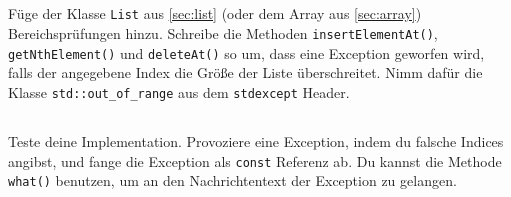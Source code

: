 \subsection{}
Füge der Klasse \texttt{List} aus \ref{sec:list} (oder dem Array aus \ref{sec:array}) Bereichsprüfungen hinzu.
Schreibe die Methoden \texttt{insertElementAt()}, \texttt{getNthElement()} und \texttt{deleteAt()} so um, dass eine Exception geworfen wird, falls der angegebene Index die Größe der Liste überschreitet.
Nimm dafür die Klasse \texttt{std::out\_of\_range} aus dem \texttt{stdexcept} Header.

\subsection{}
Teste deine Implementation.
Provoziere eine Exception, indem du falsche Indices angibst, und fange die Exception als \texttt{const} Referenz ab. Du kannst die Methode \texttt{what()} benutzen, um an den Nachrichtentext der Exception zu gelangen.
